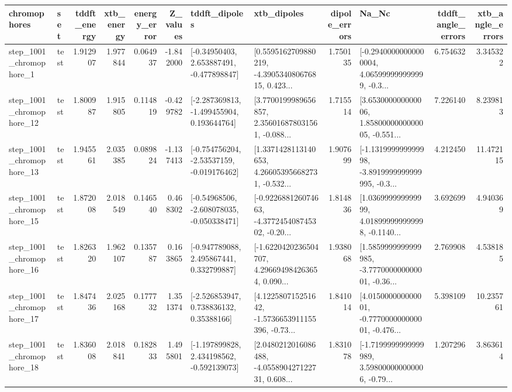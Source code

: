 \begin{tabular}{llrrrrllrlrr}
\toprule
             chromophores &       set &  tddft\_energy &  xtb\_energy &  energy\_error &  Z\_values &                               tddft\_dipoles &                                        xtb\_dipoles &  dipole\_errors &                                              Na\_Nc &  tddft\_angle\_errors &  xtb\_angle\_errors \\
\midrule
  step\_1001\_chromophore\_1 &      test &      1.912907 &    1.977844 &      0.064937 & -1.842000 &    [-0.34950403, 2.653887491, -0.477898847] &  [0.5595162709880219, -4.390534080676815, 0.423... &       1.750135 &  [-0.29400000000000004, 4.065999999999999, -0.3... &            6.754632 &          3.345322 \\
 step\_1001\_chromophore\_12 &      test &      1.800987 &    1.915805 &      0.114819 & -0.429782 &   [-2.287369813, -1.499455904, 0.193644764] &  [3.7700199989656857, 2.356016878031561, -0.088... &       1.715514 &  [3.653000000000006, 1.8580000000000005, -0.551... &            7.226140 &          8.239813 \\
 step\_1001\_chromophore\_13 &      test &      1.945561 &    2.035385 &      0.089824 & -1.137413 &   [-0.754756204, -2.53537159, -0.019176462] &  [1.3371428113140653, 4.266053956682731, -0.532... &       1.907699 &  [-1.131999999999998, -3.8919999999999995, -0.3... &            4.212450 &         11.472115 \\
 step\_1001\_chromophore\_15 &      test &      1.872008 &    2.018549 &      0.146540 &  0.468302 &   [-0.54968506, -2.608078035, -0.050338471] &  [-0.922688126074663, -4.377245408745302, -0.20... &       1.814836 &  [1.036999999999999, 4.018999999999998, -0.1140... &            3.692699 &          4.940369 \\
 step\_1001\_chromophore\_16 &      test &      1.826320 &    1.962107 &      0.135787 &  0.163865 &    [-0.947789088, 2.495867441, 0.332799887] &  [-1.6220420236504707, 4.296694984263654, 0.090... &       1.938068 &  [1.5859999999999985, -3.777000000000001, -0.36... &            2.769908 &          4.538185 \\
 step\_1001\_chromophore\_17 &      test &      1.847436 &    2.025168 &      0.177732 &  1.351374 &     [-2.526853947, 0.738836132, 0.35388166] &  [4.122580715251642, -1.5736653911155396, -0.73... &       1.841014 &  [4.015000000000001, -0.777000000000001, -0.476... &            5.398109 &         10.235761 \\
 step\_1001\_chromophore\_18 &      test &      1.836008 &    2.018841 &      0.182833 &  1.495801 &   [-1.197899828, 2.434198562, -0.592139073] &  [2.0480212016086488, -4.055890427122731, 0.608... &       1.831078 &  [-1.7199999999999989, 3.598000000000006, -0.79... &            1.207296 &          3.863614 \\

\end{tabular}
